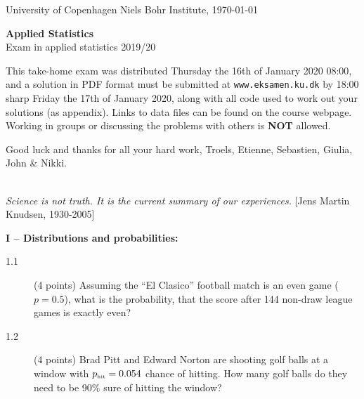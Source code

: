 \documentclass[11pt]{article}
\begin{document}

\noindent
University of Copenhagen \hfill
Niels Bohr Institute, \today \par
\vspace{-2ex}
\noindent
\hrulefill

\vspace{1ex}
\begin{center}
{\bf {\Huge Applied Statistics}}\\
\vspace{1ex}
{\large Exam in applied statistics 2019/20}
\end{center}

\vspace{0ex}
\noindent
This take-home exam was distributed Thursday the 16th of January 2020 08:00, and a solution in PDF format must be submitted at \texttt{www.eksamen.ku.dk} by 18:00 sharp Friday the 17th of January 2020, along with all code used to work out your solutions (as appendix). Links to data files can be found on the course webpage. Working in groups or discussing the problems with others is {\bf NOT} allowed.

\vspace{-1ex}
\begin{center}
  Good luck and thanks for all your hard work, Troels, Etienne, Sebastien, Giulia, John \& Nikki.
\end{center}


\noindent
\hrulefill\\
\emph{Science is not truth. It is the current summary of our experiences.} \hfill [Jens Martin Knudsen, 1930-2005]\\[-2ex]

\vspace{-2ex}
\noindent
\hrulefill

\vspace{4ex}
\noindent
{\bf I -- Distributions and probabilities:}
\begin{description}
\item[1.1] (4 points) Assuming the ``El Clasico'' football match is an even game ($p = 0.5$),
  what is the probability, that the score after 144 non-draw league games is exactly even?
%
\item[1.2] (4 points)
  Brad Pitt and Edward Norton are shooting golf balls at a window with $p_{\mbox{\tiny hit}} = 0.054$
  chance of hitting. How many golf balls do they need to be 90\% sure of hitting the window?
\end{description}
\end{document}

